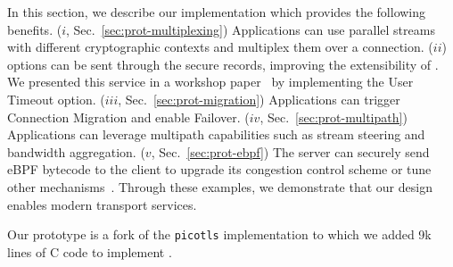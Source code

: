 \label{sec:content}

In this section, we describe our \tcpls implementation which provides the
following benefits. ($i$, Sec.~\ref{sec:prot-multiplexing}) Applications can use parallel streams with different cryptographic  contexts and multiplex them over a \tcp connection.
($ii$) \tcp options can be sent through the secure \tcpls records, improving
the extensibility of \tcp. We presented this service in a workshop
paper~\cite{rochet2020tcpls} by implementing the \tcp User Timeout option.
($iii$, Sec.~\ref{sec:prot-migration}) Applications can trigger  Connection Migration and enable Failover. ($iv$, Sec.~\ref{sec:prot-multipath}) Applications can leverage  multipath  capabilities such as stream  steering %
and bandwidth aggregation.
($v$, Sec.~\ref{sec:prot-ebpf}) The server can securely send eBPF  bytecode to the client  to upgrade its \tcp congestion control scheme or tune other \tcp
mechanisms~\cite{brakmo2017tcp,tran2019beyond}. Through these examples,
we demonstrate that our design enables modern transport services.

Our prototype is a fork of the \texttt{picotls}  implementation
to which we added 9k lines of C code to implement \tcpls.

